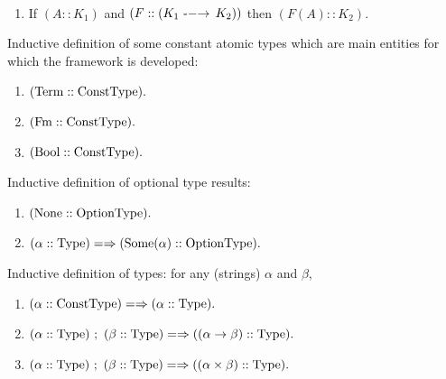 \begin{axiom}\
\begin{enumerate}
\item If $(A::K_1)$ and $(F::(K_1\ \mathrm{\mbox{-}-}\hspace{-1mm}\rightarrow\, K_2))$ then $(F(A)::K_2)$.
\end{enumerate}
\end{axiom}

\begin{definition}[$\ConstType$]
Inductive definition of some constant atomic types which are main entities for which the framework is developed:
\begin{enumerate}
\item $(\mathrm{Term}::\mathrm{ConstType}).$
\item $(\mathrm{Fm}::\mathrm{ConstType}).$
\item $(\mathrm{Bool}::\mathrm{ConstType}).$

\end{enumerate}
\end{definition}
\begin{definition}[$\OptionType$]
Inductive definition of optional type results:
\begin{enumerate}
\item $(\mathrm{None}::\mathrm{OptionType}).$
\item $(\alpha::\mathrm{Type}) =\Rightarrow (\mathrm{Some}(\alpha)::\mathrm{OptionType}).$
\end{enumerate}
\end{definition}
\begin{definition}[$\Type$]
\label{def:Type}
Inductive definition of types: for any (strings) $\alpha$ and $\beta$,
\begin{enumerate}
\iftrue %
\item $(\alpha::\mathrm{ConstType}) =\Rightarrow  (\alpha::\mathrm{Type}).$
\fi
\item $(\alpha::\mathrm{Type})\ ;\ (\beta::\mathrm{Type}) =\Rightarrow ((\alpha\to \beta)::\mathrm{Type}).$
\item $(\alpha::\mathrm{Type})\ ;\ (\beta::\mathrm{Type}) =\Rightarrow ((\alpha \times \beta)::\mathrm{Type}).$

\end{enumerate}
\end{definition}
